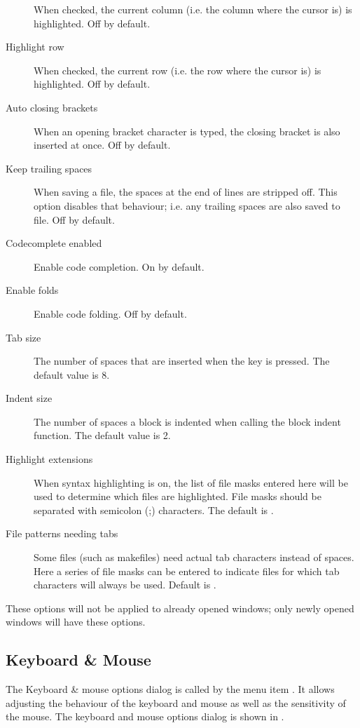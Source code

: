 \begin{description}
When checked, the current column (i.e. the column where the cursor is) is
highlighted. Off by default.
\item[Highlight row]
When checked, the current row (i.e. the row where the cursor is) is
highlighted. Off by default.
\item[Auto closing brackets]
When an opening bracket character is typed, the closing bracket is also
inserted at once. Off by default.
\item[Keep trailing spaces]
When saving a file, the spaces at the end of lines are stripped off. This
option disables that behaviour; i.e. any trailing spaces are also saved
to file. Off by default.
\item[Codecomplete enabled]
Enable code completion. On by default.
\item[Enable folds]
Enable code folding. Off by default.
\item[Tab size]
The number of spaces that are inserted when the  key is pressed.
The default value is 8.
\item[Indent size]
The number of spaces a block is indented when calling the block indent function.
The default value is 2.
\item[Highlight extensions]
When syntax highlighting is on, the list of file masks entered here will be
used to determine which files are highlighted. File masks should be
separated with semicolon (;) characters. The default is
.
\item[File patterns needing tabs]
Some files (such as makefiles) need actual tab characters instead of spaces.
Here a series of file masks can be entered to indicate files for which tab 
characters will always be used. Default is .
\end{description}
\begin{remark}
These options will not be applied to already opened windows; only newly
opened windows will have these options.
\end{remark}
%
%
\subsection{Keyboard \& Mouse}
\label{se:prefmouse}
The Keyboard \& mouse options dialog is called by the menu item
. It allows adjusting the behaviour of the
keyboard and mouse as well as the sensitivity of the mouse.
The keyboard and mouse options dialog is shown in .

